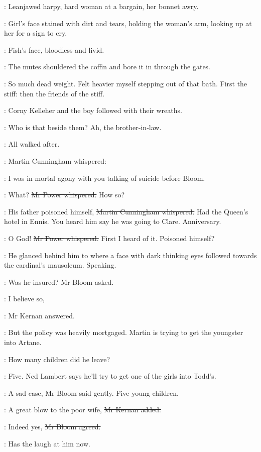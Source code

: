 \BloomInt:
Leanjawed harpy, hard woman at a bargain, her bonnet awry.

:
Girl's face stained with dirt and tears,
holding the woman's arm, looking up at her for a sign to cry.

\BloomInt:
Fish's face,
bloodless and livid.

:
The mutes shouldered the coffin and bore it in through the gates.

\BloomInt:
So much dead weight.
Felt heavier myself stepping out of that bath.
First the stiff:
then the friends of the stiff.

:
Corny Kelleher and the boy followed with their wreaths.

\BloomInt:
Who is that beside them?
Ah, the brother-in-law.

:
All walked after.

:
Martin Cunningham whispered:

\cunningham:
I was in mortal agony with you talking of suicide before Bloom.

\power:
What?
\sout{Mr Power whispered.}
How so?

\cunningham:
His father poisoned himself,
\sout{Martin Cunningham whispered.}
Had the Queen's hotel in Ennis.
You heard him say he was going to Clare.
Anniversary.

\power:
O God!
\sout{Mr Power whispered.}
First I heard of it.
Poisoned himself?

:
He glanced behind him to where
a face with dark thinking eyes followed towards the cardinal's mausoleum.
Speaking.

\Bloom:
Was he insured?
\sout{Mr Bloom asked.}

:
I believe so,

:
Mr Kernan answered.

:
But the policy was heavily mortgaged.
Martin is trying to get the youngster into Artane.

\Bloom:
How many children did he leave?

:
Five.
Ned Lambert says he'll try to get one of the girls into Todd's.

\Bloom:
A sad case,
\sout{Mr Bloom said gently.}
Five young children.

:
A great blow to the poor wife,
\sout{Mr Kernan added.}

\Bloom:
Indeed yes,
\sout{Mr Bloom agreed.}

\BloomInt:
Has the laugh at him now.

